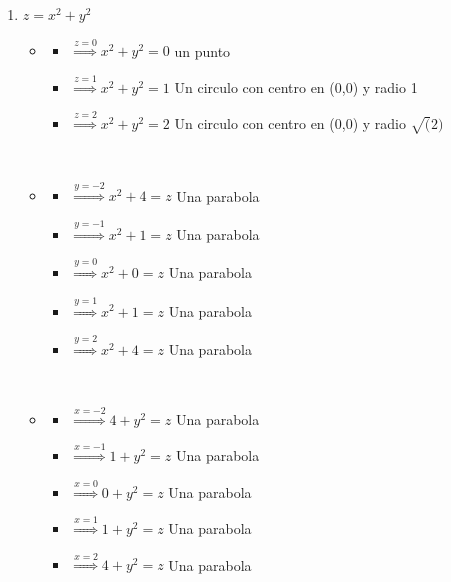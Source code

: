\documentclass[../practica_02.tex]{subfiles}
\begin{document}
\begin{enumerate}
\begin{enumerate}
                \item $z = x^2 + y^2$

                    \begin{itemize}
                        \item
                            \begin{itemize}
                                \item $\stackrel{z=0}{\Rightarrow} x^2 + y^2 = 0$ un punto
                                \item $\stackrel{z=1}{\Rightarrow} x^2 + y^2 = 1$ Un circulo con centro en (0,0) y radio 1
                                \item $\stackrel{z=2}{\Rightarrow} x^2 + y^2 = 2$ Un circulo con centro en (0,0) y radio $\sqrt(2)$
                            \end{itemize}

                            $ $

                        \item
                            \begin{itemize}
                                \item $\stackrel{y=-2}{\Rightarrow} x^2 + 4 = z $ Una parabola
                                \item $\stackrel{y=-1}{\Rightarrow} x^2 + 1 = z $ Una parabola
                                \item $\stackrel{y=0}{\Rightarrow} x^2 +  0 = z $ Una parabola
                                \item $\stackrel{y=1}{\Rightarrow} x^2 +  1 = z $ Una parabola
                                \item $\stackrel{y=2}{\Rightarrow} x^2 +  4 = z $ Una parabola
                            \end{itemize}

                            $ $

                        \item
                            \begin{itemize}
                                \item $\stackrel{x=-2}{\Rightarrow} 4 + y^2 = z $ Una parabola
                                \item $\stackrel{x=-1}{\Rightarrow} 1 + y^2 = z $ Una parabola
                                \item $\stackrel{x=0}{\Rightarrow}  0 + y^2  = z $ Una parabola
                                \item $\stackrel{x=1}{\Rightarrow}  1 + y^2  = z $ Una parabola
                                \item $\stackrel{x=2}{\Rightarrow}  4 + y^2  = z $ Una parabola
                            \end{itemize}


\end{itemize}
\end{enumerate}
\end{enumerate}
\end{document}
